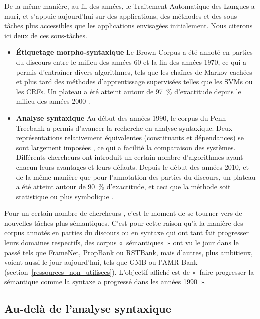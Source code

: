 De la même manière, au fil des années, le Traitement Automatique des Langues a
muri, et s'appuie aujourd'hui sur des applications, des méthodes et des
sous-tâches plus accessibles que les applications envisagées initialement. Nous
citerons ici deux de ces sous-tâches.

\begin{itemize}
    \item \textbf{Étiquetage morpho-syntaxique} Le Brown Corpus a été annoté en
parties du discours entre le milieu des années 60 et la fin des années 1970, ce
qui a permis d'entraîner divers algorithmes, tels que les chaînes de Markov
cachées et plus tard des méthodes d'apprentissage supervisées telles que les
SVMs ou les CRFs. Un plateau a été atteint autour de 97~\% d'exactitude depuis
le milieu des années 2000 \citep{manning2011part}.
    \item \textbf{Analyse syntaxique} Au début des années 1990, le corpus du
Penn Treebank \citep{marcus1993building} a permis d'avancer la recherche en
analyse syntaxique. Deux représentations relativement équivalentes
(constituants et dépendances) se sont largement imposées
\citep{rambow2010simple}, ce qui a facilité la comparaison des systèmes.
Différents chercheurs ont introduit un certain nombre d'algorithmes ayant
chacun leurs avantages et leurs défauts. Depuis le début des années 2010, et de
la même manière que pour l'annotation des parties du discours, un plateau a été
atteint autour de 90~\% d'exactitude, et ceci que la méthode soit statistique
ou plus symbolique \citep{clergerie2014jouer}.
\end{itemize}

Pour un certain nombre de chercheurs
\citep{bos2012annotating,banarescu2013abstract}, c'est le moment de se tourner
vers de nouvelles tâches plus sémantiques. C'est pour cette raison qu'à la
manière des corpus annotés en parties du discours ou en syntaxe qui ont tant
fait progresser leurs domaines respectifs, des corpus «~sémantiques~» ont vu le
jour dans le passé tels que FrameNet, PropBank ou RSTBank, mais d'autres, plus
ambitieux, voient aussi le jour aujourd'hui, tels que GMB
\citep{bos2012annotating} ou l'AMR Bank \citep{banarescu2013abstract}
(section~\ref{ressources_non_utilisees}). L'objectif affiché est de «~faire
progresser la sémantique comme la syntaxe a progressé dans les années 1990~».

\subsection{Au-delà de l'analyse syntaxique}
\label{au_dela}

